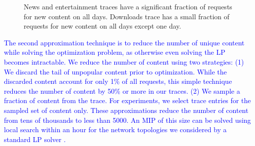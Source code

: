 {\begin{figure}[t]
\begin{center}
{\label{fig:downloadnumberchurn}}
\end{center}
\vspace{-0.25in}
\caption{News and entertainment traces have a significant fraction of requests for new content on all days. Downloads trace has a small fraction of requests for new content on all days except one day.}
\vspace{-0.1in}
\label{fig:akamaichurn}
\end{figure}
}
\textcolor{blue}
{
The second approximation technique is to reduce the number of unique content while solving the optimization problem, as otherwise even solving the LP becomes intractable. We reduce the number of content using two strategies: (1) We discard the tail of unpopular content prior to optimization. While the discarded content account for only 1\% of all requests, this simple technique reduces the number of content by 50\% or more in our traces.  (2) We sample a fraction of content from the trace. For experiments, we select trace entries for the sampled set of content  only.  These  approximations reduce the number of content from tens of thousands to less than 5000. An MIP of this size can be solved using local search within an hour for the network topologies we considered by a standard LP solver \cite{CPLEX}.
}



%

